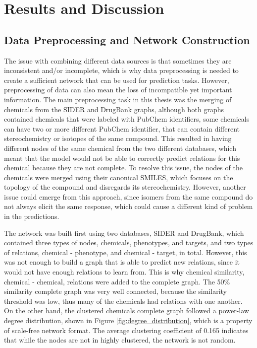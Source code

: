 \chapter{Results and Discussion}
\label{results}

\section{Data Preprocessing and Network Construction}
The issue with combining different data sources is that sometimes they are inconsistent and/or incomplete, which is why data preprocessing is needed to create a sufficient network that can be used for prediction tasks.
However, preprocessing of data can also mean the loss of incompatible yet important information.
The main preprocessing task in this thesis was the merging of chemicals from the \ac{SIDER} and DrugBank graphs, although both graphs contained chemicals that were labeled with PubChem identifiers, some chemicals can have two or more different PubChem identifier, that can contain different stereochemistry or isotopes of the same compound.
This resulted in having different nodes of the same chemical from the two different databases, which meant that the model would not be able to correctly predict relations for this chemical because they are not complete.
To resolve this issue, the nodes of the chemicals were merged using their canonical \ac{SMILES}, which focuses on the topology of the compound and disregards its stereochemistry.
However, another issue could emerge from this approach, since isomers from the same compound do not always elicit the same response, which could cause a different kind of problem in the predictions.

The network was built first using two databases, \ac{SIDER} and DrugBank, which contained three types of nodes, chemicals, phenotypes, and targets, and two types of relations, chemical - phenotype, and chemical - target, in total.
However, this was not enough to build a graph that is able to predict new relations, since it would not have enough relations to learn from.
This is why chemical similarity, chemical - chemical, relations were added to the complete graph.
The 50\% similarity complete graph was very well connected, because the similarity threshold was low, thus many of the chemicals had relations with one another.
On the other hand, the clustered chemicals complete graph followed a power-law degree distribution, shown in Figure \ref{fig:degree_distribution}, which is a property of scale-free network format.
The average clustering coefficient of 0.165 indicates that while the nodes are not in highly clustered, the network is not random.

